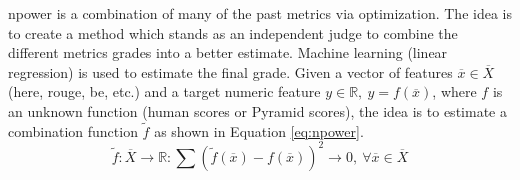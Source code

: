 \ac{npower} \citep{13-giannakopoulos-karkaletsis} is a combination of many of the past metrics via optimization. 
The idea is to create a method which stands as an independent judge to combine the different metrics grades into a better estimate. 
Machine learning (linear regression) is used to estimate the final grade. 
Given a vector of features $ \overline{x} \in \overline{X}  $ (here, \ac{rouge}, \ac{be}, etc.) and a target numeric feature $ y \in \mathbb{R},\ y = f(\overline{x}) $, where $ f $ is an unknown function (human scores or Pyramid scores), the idea is to estimate a combination function $ \tilde{f} $ as shown in Equation \ref{eq:npower}.
\begin{equation}
	\label{eq:npower}
	\tilde{f}: \overline{X} \rightarrow \mathbb{R}: 
	\sum (\tilde{f}(\overline{x}) - f(\overline{x}))^2 \rightarrow 0,\ \forall \overline{x} \in \overline{X}
\end{equation}

